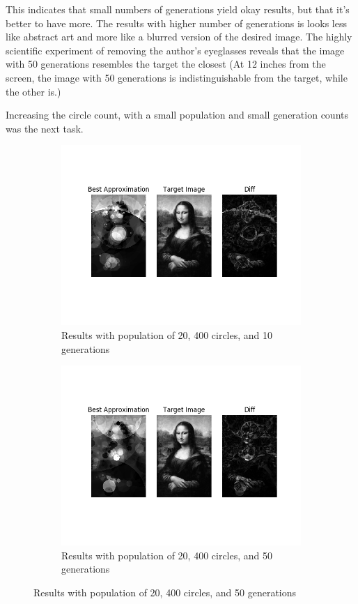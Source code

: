 \documentclass{article}
\begin{document}
This indicates that small numbers of generations yield okay results, but that it's better to have more. The results with higher number of generations is looks less like abstract art and more like a blurred version of the desired image. The highly scientific experiment of removing the author's eyeglasses reveals that the image with 50 generations resembles the target the closest (At 12 inches from the screen, the image with 50 generations is indistinguishable from the target, while the other is.)

Increasing the circle count, with a small population and small generation counts was the next task.

\begin{figure}[H]
    \centering
    \begin{subfigure}[b]{0.45\textwidth}
        \centering
        \includegraphics[width=\textwidth]{output/bs-p20c400g10.png}
        \caption{Results with population of 20, 400 circles, and 10 generations}
    \end{subfigure}
    \begin{subfigure}[b]{0.45\textwidth}
        \centering
        \includegraphics[width=\textwidth]{output/bs-p20c400g50.png}
        \caption{Results with population of 20, 400 circles, and 50 generations}
    \end{subfigure}
\end{figure}
\end{document}
